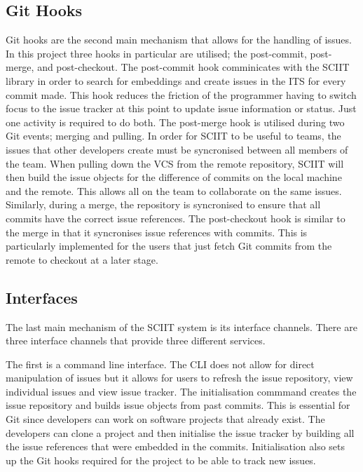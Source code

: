 \documentclass{mproj}
\begin{document}
\subsection{Git Hooks}

Git hooks are the second main mechanism that allows for the handling of issues. In this project three hooks in particular are utilised; the post-commit, post-merge, and post-checkout. The post-commit hook comminicates with the SCIIT library in order to search for embeddings and create issues in the ITS for every commit made. This hook reduces the friction of the programmer having to switch focus to the issue tracker at this point to update issue information or status. Just one activity is required to do both. The post-merge hook is utilised during two Git events; merging and pulling. In order for SCIIT to be useful to teams, the issues that other developers create must be syncronised between all members of the team. When pulling down the VCS from the remote repository, SCIIT will then build the issue objects for the difference of commits on the local machine and the remote. This allows all on the team to collaborate on the same issues. Similarly, during a merge, the repository is syncronised to ensure that all commits have the correct issue references. The post-checkout hook is similar to the merge in that it syncronises issue references with commits. This is particularly implemented for the users that just fetch Git commits from the remote to checkout at a later stage.

\subsection{Interfaces}

The last main mechanism of the SCIIT system is its interface channels. There are three interface channels that provide three different services. 

The first is a command line interface. The CLI does not allow for direct manipulation of issues but it allows for users to refresh the issue repository, view individual issues and view issue tracker. The initialisation commmand creates the issue repository and builds issue objects from past commits. This is essential for Git since developers can work on software projects that already exist. The developers can clone a project and then initialise the issue tracker by building all the issue references that were embedded in the commits. Initialisation also sets up the Git hooks required for the project to be able to track new issues. 
\end{document}
